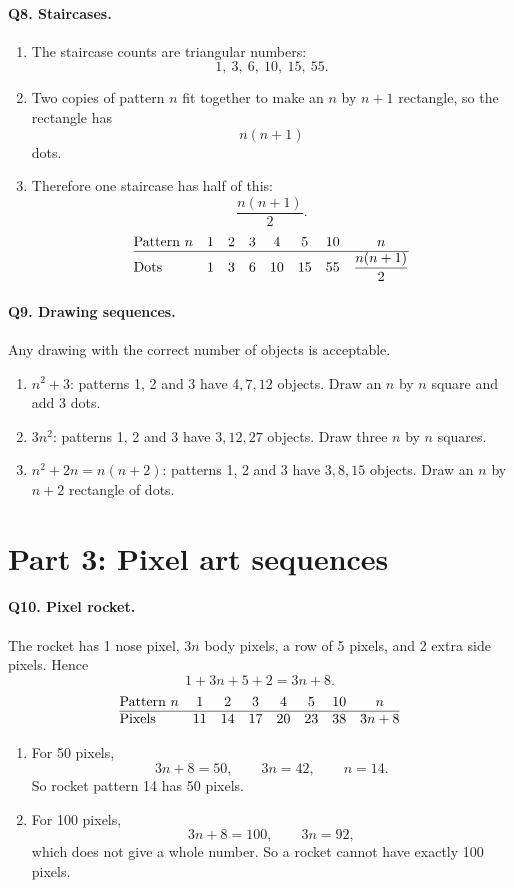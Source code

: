 \documentclass[11pt,a4paper]{article}
\begin{document}
\paragraph{Q8. Staircases.}
\begin{enumerate}[label=(\alph*),leftmargin=*,itemsep=4pt]
\item The staircase counts are triangular numbers:
\[
1,\ 3,\ 6,\ 10,\ 15,\ 55.
\]

\item Two copies of pattern \(n\) fit together to make an \(n\) by \(n+1\) rectangle, so the rectangle has
\[
n(n+1)
\]
dots.

\item Therefore one staircase has half of this:
\[
\frac{n(n+1)}{2}.
\]
\[
\begin{array}{@{}lccccccc@{}}
\text{Pattern }n&1&2&3&4&5&10&n\\ \hline
\text{Dots}&1&3&6&10&15&55&\dfrac{n(n+1)}{2}
\end{array}
\]
\end{enumerate}

\paragraph{Q9. Drawing sequences.}
Any drawing with the correct number of objects is acceptable.
\begin{enumerate}[label=(\alph*),leftmargin=*,itemsep=4pt]
\item \(n^2+3\): patterns 1, 2 and 3 have \(4,7,12\) objects. Draw an \(n\) by \(n\) square and add 3 dots.
\item \(3n^2\): patterns 1, 2 and 3 have \(3,12,27\) objects. Draw three \(n\) by \(n\) squares.
\item \(n^2+2n=n(n+2)\): patterns 1, 2 and 3 have \(3,8,15\) objects. Draw an \(n\) by \(n+2\) rectangle of dots.
\end{enumerate}

\section*{Part 3: Pixel art sequences}

\paragraph{Q10. Pixel rocket.}
The rocket has 1 nose pixel, \(3n\) body pixels, a row of 5 pixels, and 2 extra side pixels. Hence
\[
1+3n+5+2=3n+8.
\]
\[
\begin{array}{@{}lccccccc@{}}
\text{Pattern }n&1&2&3&4&5&10&n\\ \hline
\text{Pixels}&11&14&17&20&23&38&3n+8
\end{array}
\]
\begin{enumerate}[label=(\alph*),leftmargin=*,itemsep=4pt,start=2]
\item For 50 pixels,
\[
3n+8=50,\qquad 3n=42,\qquad n=14.
\]
So rocket pattern 14 has 50 pixels.

\item For 100 pixels,
\[
3n+8=100,\qquad 3n=92,
\]
which does not give a whole number. So a rocket cannot have exactly 100 pixels.
\end{enumerate}
\end{document}
